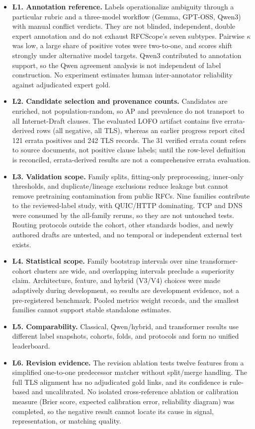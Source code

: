 \documentclass[12pt,a4paper,oneside]{report}
\begin{document}
\begin{itemize}[leftmargin=*]
  \item \textbf{L1. Annotation reference.} Labels operationalize ambiguity through a particular rubric and a three-model workflow (Gemma, GPT-OSS, Qwen3) with manual conflict verdicts. They are not blinded, independent, double expert annotation and do not exhaust RFCScope's seven subtypes. Pairwise $\kappa$ was low, a large share of positive votes were two-to-one, and scores shift strongly under alternative model targets. Qwen3 contributed to annotation support, so the Qwen agreement analysis is not independent of label construction. No experiment estimates human inter-annotator reliability against adjudicated expert gold.
  \item \textbf{L2. Candidate selection and provenance counts.} Candidates are enriched, not population-random, so AP and prevalence do not transport to all Internet-Draft clauses. The evaluated LOFO artifact contains five errata-derived rows (all negative, all TLS), whereas an earlier progress report cited 121 errata positives and 242 TLS records. The 31 verified errata count refers to source documents, not positive clause labels; until the row-level definition is reconciled, errata-derived results are not a comprehensive errata evaluation.
  \item \textbf{L3. Validation scope.} Family splits, fitting-only preprocessing, inner-only thresholds, and duplicate/lineage exclusions reduce leakage but cannot remove pretraining contamination from public RFCs. Nine families contribute to the reviewed-label study, with QUIC/HTTP dominating. TCP and DNS were consumed by the all-family reruns, so they are not untouched tests. Routing protocols outside the cohort, other standards bodies, and newly authored drafts are untested, and no temporal or independent external test exists.
  \item \textbf{L4. Statistical scope.} Family bootstrap intervals over nine transformer-cohort clusters are wide, and overlapping intervals preclude a superiority claim. Architecture, feature, and hybrid (V3/V4) choices were made adaptively during development, so results are development evidence, not a pre-registered benchmark. Pooled metrics weight records, and the smallest families cannot support stable standalone estimates.
  \item \textbf{L5. Comparability.} Classical, Qwen/hybrid, and transformer results use different label snapshots, cohorts, folds, and protocols and form no unified leaderboard.
  \item \textbf{L6. Revision evidence.} The revision ablation tests twelve features from a simplified one-to-one predecessor matcher without split/merge handling. The full TLS alignment has no adjudicated gold links, and its confidence is rule-based and uncalibrated. No isolated cross-reference ablation or calibration measure (Brier score, expected calibration error, reliability diagram) was completed, so the negative result cannot locate its cause in signal, representation, or matching quality.

\end{itemize}
\end{document}
